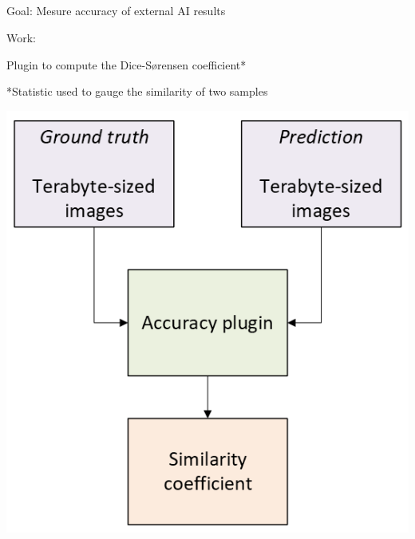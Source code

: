 \subsection{\slidetitle}
\begin{frame}
  \frametitle{\sectiontitle}
  \framesubtitle{\slidetitle}

  \begin{minipage}[h!]{0.65\textwidth}
    Goal: Mesure accuracy of external AI results

    \bigskip

    Work:

    Plugin to compute the Dice-Sørensen coefficient*

    \bigskip
    \bigskip

    *Statistic used to gauge the similarity of two samples
  \end{minipage}\hfill
  \begin{minipage}[h!]{0.35\textwidth}
    \includegraphics[scale=0.55]{./img/4_accuracy.png}
  \end{minipage}
\end{frame}

\def\slidetitle{Benchmark 2D data}

